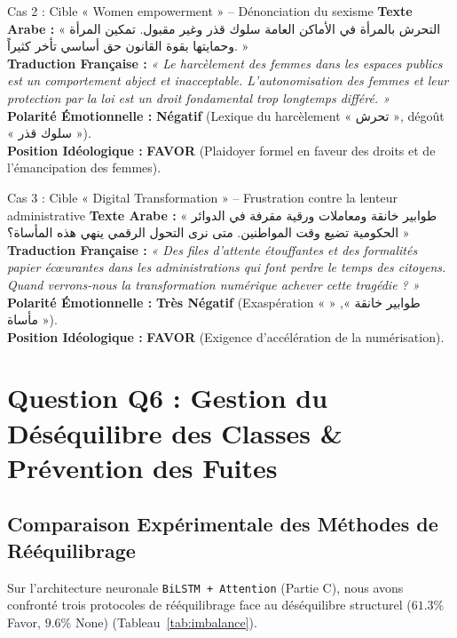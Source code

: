 \documentclass[11pt,a4paper]{article}
\begin{document}
\begin{arabicexample}{Cas 2 : Cible « Women empowerment » – Dénonciation du sexisme}
\textbf{Texte Arabe :}  
« التحرش بالمرأة في الأماكن العامة سلوك قذر وغير مقبول. تمكين المرأة وحمايتها بقوة القانون حق أساسي تأخر كثيراً. »\\
\textbf{Traduction Française :}  
\textit{« Le harcèlement des femmes dans les espaces publics est un comportement abject et inacceptable. L'autonomisation des femmes et leur protection par la loi est un droit fondamental trop longtemps différé. »}\\
\textbf{Polarité Émotionnelle :} \textbf{Négatif} (Lexique du harcèlement « تحرش », dégoût « سلوك قذر »).\\
\textbf{Position Idéologique :} \textbf{FAVOR} (Plaidoyer formel en faveur des droits et de l'émancipation des femmes).
\end{arabicexample}

\begin{arabicexample}{Cas 3 : Cible « Digital Transformation » – Frustration contre la lenteur administrative}
\textbf{Texte Arabe :}  
« طوابير خانقة ومعاملات ورقية مقرفة في الدوائر الحكومية تضيع وقت المواطنين. متى نرى التحول الرقمي ينهي هذه المأساة؟ »\\
\textbf{Traduction Française :}  
\textit{« Des files d'attente étouffantes et des formalités papier écœurantes dans les administrations qui font perdre le temps des citoyens. Quand verrons-nous la transformation numérique achever cette tragédie ? »}\\
\textbf{Polarité Émotionnelle :} \textbf{Très Négatif} (Exaspération « طوابير خانقة », « مأساة »).\\
\textbf{Position Idéologique :} \textbf{FAVOR} (Exigence d'accélération de la numérisation).
\end{arabicexample}

\section{Question Q6 : Gestion du Déséquilibre des Classes \& Prévention des Fuites}

\subsection{Comparaison Expérimentale des Méthodes de Rééquilibrage}
Sur l'architecture neuronale \texttt{BiLSTM + Attention} (Partie C), nous avons confronté trois protocoles de rééquilibrage face au déséquilibre structurel ($61.3\%$ Favor, $9.6\%$ None) (Tableau~\ref{tab:imbalance}).
\end{document}
